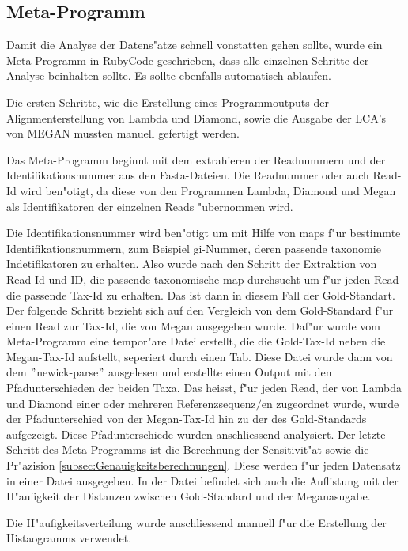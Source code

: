 \documentclass[10pt, a4paper]{report}[08.12.2015]
\begin{document}
  \subsection{Meta-Programm}
  Damit die Analyse der Datens"atze schnell vonstatten gehen sollte, wurde ein Meta-Programm in RubyCode geschrieben, dass alle einzelnen Schritte der Analyse beinhalten sollte. Es sollte ebenfalls automatisch ablaufen.
  
  
  Die ersten Schritte, wie die Erstellung eines Programmoutputs der Alignmenterstellung von Lambda und Diamond, sowie die Ausgabe der LCA's von MEGAN mussten manuell gefertigt werden.
  
  Das Meta-Programm beginnt mit dem extrahieren der Readnummern und der Identifikationsnummer aus den Fasta-Dateien. 
  Die Readnummer oder auch Read-Id wird ben"otigt, da diese von den Programmen Lambda, Diamond und Megan als Identifikatoren der einzelnen Reads "ubernommen wird.
  
 Die Identifikationsnummer wird ben"otigt um mit Hilfe von maps f"ur bestimmte Identifikationsnummern, zum Beispiel gi-Nummer, deren passende taxonomie Indetifikatoren zu erhalten.
  Also wurde nach den Schritt der Extraktion von Read-Id und ID, die passende taxonomische map durchsucht um f"ur jeden Read die passende Tax-Id zu erhalten.
  Das ist dann in diesem Fall der Gold-Standart.
  Der folgende Schritt bezieht sich auf den Vergleich von dem Gold-Standard f"ur einen Read zur Tax-Id, die von Megan ausgegeben wurde. Daf"ur wurde vom Meta-Programm eine tempor"are Datei erstellt, die die Gold-Tax-Id neben die Megan-Tax-Id aufstellt, seperiert durch einen Tab. Diese Datei wurde dann von dem $"$newick-parse$"$ ausgelesen und erstellte einen Output mit den Pfadunterschieden der beiden Taxa. Das heisst, f"ur jeden Read, der von Lambda und Diamond einer oder mehreren Referenzsequenz$/$en zugeordnet wurde, wurde der Pfadunterschied von der Megan-Tax-Id hin zu der des Gold-Standards aufgezeigt.
  Diese Pfadunterschiede wurden anschliessend analysiert. 
  Der letzte Schritt des Meta-Programms ist die Berechnung der Sensitivit"at sowie die Pr"azision \ref{subsec:Genauigkeitsberechnungen}.
  Diese werden f"ur jeden Datensatz in einer Datei ausgegeben. In der Datei befindet sich auch die Auflistung mit der H"aufigkeit der Distanzen zwischen Gold-Standard und der Meganasugabe. 
  
  Die H"aufigkeitsverteilung wurde anschliessend manuell f"ur die Erstellung der Histaogramms verwendet.  
  
  
    \newpage
\end{document}
